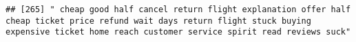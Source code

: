 \documentclass[
]{article}
\begin{document}
\begin{verbatim}
## [265] " cheap good half cancel return flight explanation offer half cheap ticket price refund wait days return flight stuck buying expensive ticket home reach customer service spirit read reviews suck"                                                                                                                                                                                                                                                                                                                                                                                                                                                                                                                                                                                                                                                                                                                                                                                                                                                                                                                                                                                                                                                                                                                                                                                                                                                                                                                                                                                                                                                                                                                                                                                             

\end{verbatim}
\end{document}
